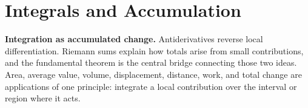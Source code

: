\chapter{Integrals and Accumulation}










\noindent\textbf{Integration as accumulated change.} Antiderivatives reverse local differentiation. Riemann sums explain how totals arise from small contributions, and the fundamental theorem is the central bridge connecting those two ideas. Area, average value, volume, displacement, distance, work, and total change are applications of one principle: integrate a local contribution over the interval or region where it acts.


